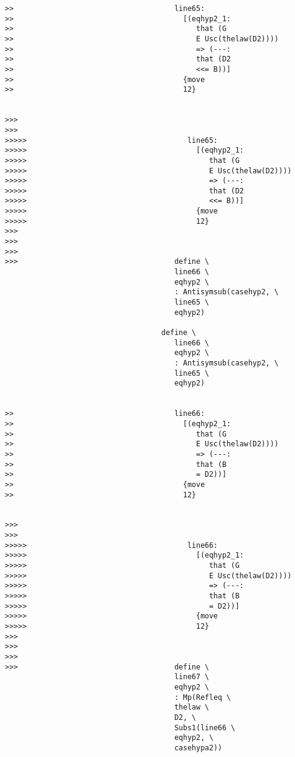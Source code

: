 \documentclass[12pt]{article}
\begin{document}
\begin{verbatim}
>>                                     line65:
>>                                       [(eqhyp2_1:
>>                                          that (G
>>                                          E Usc(thelaw(D2))))
>>                                          => (---:
>>                                          that (D2
>>                                          <<= B))]
>>                                       {move
>>                                       12}


>>>
>>>
>>>>>                                     line65:
>>>>>                                       [(eqhyp2_1:
>>>>>                                          that (G
>>>>>                                          E Usc(thelaw(D2))))
>>>>>                                          => (---:
>>>>>                                          that (D2
>>>>>                                          <<= B))]
>>>>>                                       {move
>>>>>                                       12}
>>>
>>>
>>>
>>>                                    define \
                                       line66 \
                                       eqhyp2 \
                                       : Antisymsub(casehyp2, \
                                       line65 \
                                       eqhyp2)

                                    define \
                                       line66 \
                                       eqhyp2 \
                                       : Antisymsub(casehyp2, \
                                       line65 \
                                       eqhyp2)


>>                                     line66:
>>                                       [(eqhyp2_1:
>>                                          that (G
>>                                          E Usc(thelaw(D2))))
>>                                          => (---:
>>                                          that (B
>>                                          = D2))]
>>                                       {move
>>                                       12}


>>>
>>>
>>>>>                                     line66:
>>>>>                                       [(eqhyp2_1:
>>>>>                                          that (G
>>>>>                                          E Usc(thelaw(D2))))
>>>>>                                          => (---:
>>>>>                                          that (B
>>>>>                                          = D2))]
>>>>>                                       {move
>>>>>                                       12}
>>>
>>>
>>>
>>>                                    define \
                                       line67 \
                                       eqhyp2 \
                                       : Mp(Refleq \
                                       thelaw \
                                       D2, \
                                       Subs1(line66 \
                                       eqhyp2, \
                                       casehypa2))


\end{verbatim}
\end{document}
